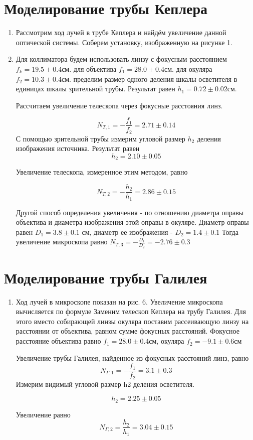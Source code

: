 \documentclass[14pt,a4paper]{scrartcl}
\begin{document}
\section{Моделирование трубы Кеплера}
\begin{enumerate}
    \item Рассмотрим ход лучей в трубе Кеплера и найдём увеличение данной оптической системы. Соберем установку, изображенную на рисунке 1.
    \item Для коллиматора будем использовать
линзу с фокусным расстоянием $f_{k}=19.5 \pm 0.4$см. для объектива $f_{1}=28.0 \pm 0.4$см.
для окуляра $f_{2}=10.3 \pm 0.4$см. пределим размер одного деления шкалы осветителя в
единицах шкалы зрительной трубы. Результат равен $h_{1}=0.72  \pm  0.02$см.

Рассчитаем увеличение телескопа через фокусные расстояния линз.

$$
N_{T, 1}=-\frac{f_{1}}{f_{2}}=2.71 \pm 0.14
$$
С помощью зрительной трубы измерим угловой размер $h_{2}$ деления изображения источника. Результат равен
$$
h_{2}=2.10 \pm 0.05
$$

Увеличение телескопа, измеренное этим методом, равно

$$
N_{T, 2}=-\frac{h_{2}}{h_{1}}=2.86 \pm 0.15
$$

Другой способ определения увеличения - по отношению диаметра оправы объектива и
диаметра изображения этой оправы в окуляре. Диаметр оправы равен $D_{1}=3.8 \pm 0.1$ см, диаметр ее изображения - $D_{2}=1.4 \pm 0.1$
Тогда увеличение микроскопа равно $N_{T, 3}=-\frac{D_{1}}{D_{2}}=-2.76 \pm 0.3$
\end{enumerate}


\section{Моделирование трубы Галилея}
    \begin{enumerate}
    \item Ход лучей в микроскопе показан на рис. 6. Увеличение микроскопа вычисляется по формуле
 Заменим телескоп Кеплера на трубу Галилея. Для этого вместо собирающей линзы окуляра поставим рассеивающую линзу на расстоянии от объектива, равном сумме фокусных расстояний. Фокусное расстояние объектива равно 
 $f_{1}=28.0 \pm 0.4$см, окуляра $f_{2}=-9.1 \pm 0.6$см
 
 Увеличение трубы Галилея, найденное из фокусных расстояний линз, равно
 $$
N_{\Gamma, 1}=-\frac{f_{1}}{f_{2}}=3.1 \pm 0.3
$$
Измерим видимый угловой размер h2 деления осветителя.

$$
h_{2}=2.25 \pm 0.05
$$

Увеличение равно
$$
N_{\Gamma, 2}=\frac{h_{2}}{h_{1}}=3.04 \pm 0.15
$$
 \end{enumerate}
\begin{enumerate}

\end{enumerate}
\end{document}
